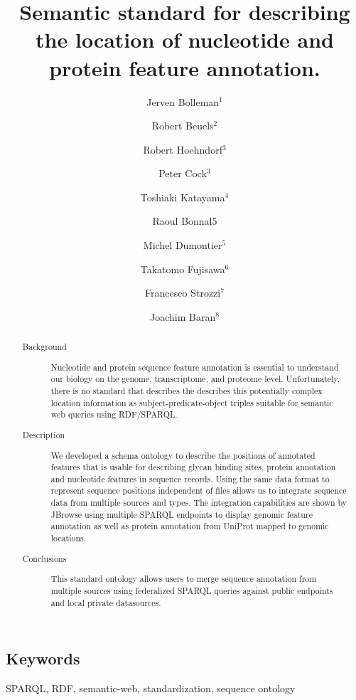 \documentclass[10pt]{bmc_article}
\newenvironment{bmcformat}{\begin{raggedright}\baselineskip20pt\sloppy\setboolean{publ}{false}}{\end{raggedright}\baselineskip20pt\sloppy}
\begin{document}
\begin{bmcformat}
\title{Semantic standard for describing the location of nucleotide and protein feature annotation.}
\author{Jerven Bolleman\correspondingauthor$^1$  
         \and Robert Beuels$^2$%
         \and Robert Hoehndorf$^3$%
         \and Peter Cock$^3$ %
		 \and Toshiaki Katayama$^4$ %
		 \and Raoul Bonnal$5$ %
		 \and Michel Dumontier$^5$ %
		 \and Takatomo Fujisawa$^6$ %
		 \and Francesco Strozzi$^7$ %
		 \and Joachim Baran$^8$ %
         }
\address{
    \iid(1)SIB Swiss Institute of Bioinformatics, Centre Medical Universitaire, 1 rue Michel
Servet, 1211 Geneva 4, Switzerland,
 \iid(2) fill in,
 \iid(3) fill in,
 \iid(4) fill in,
 \iid(5) INGM,
 \iid(6) fill in,
 \iid(7) fill in, and
 \iid(8) fill in.
        }
\maketitle

\begin{abstract}
\begin{description}
\item[Background] Nucleotide and protein sequence feature annotation is essential to understand our biology on the genome, transcriptome, and proteome level. Unfortunately, there is no standard that describes the describes this potentially complex location information as
subject-predicate-object triples suitable for semantic web queries using RDF/SPARQL.
\item[Description] We developed a schema ontology to describe the positions of annotated features that is usable for describing glycan binding sites, protein annotation and nucleotide features in sequence records.
Using the same data format to represent sequence positions independent of files allows us to integrate sequence data from multiple sources and types.
The integration capabilities are shown by JBrowse using multiple SPARQL endpoints to display genomic feature annotation as well as protein annotation from UniProt mapped to genomic locations.
\item[Conclusions] This standard ontology allows users to merge sequence annotation from multiple sources using federalized SPARQL queries against public endpoints and local private datasources.
\end{description}
\end{abstract}

\section{Keywords}
SPARQL, RDF, semantic-web, standardization, sequence ontology


\end{bmcformat}
\end{document}
